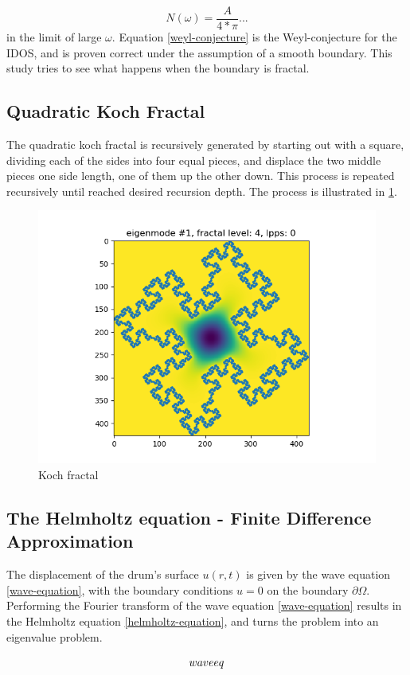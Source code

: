 \documentclass{article}
\begin{document}
\begin{equation}
    \label{weyl-conjecture}
    N(\omega) = \frac{A}{4*\pi}...
\end{equation}
in the limit of large $\omega$. Equation \ref{weyl-conjecture} is the Weyl-conjecture for the IDOS, and is proven correct under the assumption of a smooth boundary. This study tries to see what happens when the boundary is fractal.

\subsection{Quadratic Koch Fractal}\label{theory-koch}
The quadratic koch fractal is recursively generated by starting out with a square, dividing each of the sides into four equal pieces, and displace the two middle pieces one side length, one of them up the other down. This process is repeated recursively until reached desired recursion depth. The process is illustrated in \ref{generate-koch}.

\begin{figure}
    \includegraphics[width=0.5\linewidth]{../figs/eigenmode_2d1.png}
    \caption{Koch fractal}
    \label{generate-koch}
\end{figure}

\subsection{The Helmholtz equation - Finite Difference Approximation}
The displacement of the drum's surface $u(r, t)$ is given by the wave equation \ref{wave-equation}, with the boundary conditions $u = 0$ on the boundary $\partial \Omega$. Performing the Fourier transform of the wave equation \ref{wave-equation} results in the Helmholtz equation \ref{helmholtz-equation}, and turns the problem into an eigenvalue problem.

\begin{equation}
    waveeq \\
\end{equation}
\end{document}
